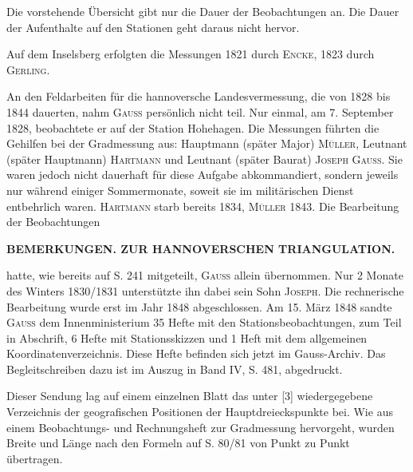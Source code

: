 \par\noindent\hspace*{\parindent}Die vorstehende Übersicht gibt nur die Dauer der Beobachtungen an. Die Dauer der Aufenthalte auf den Stationen geht daraus nicht hervor.

\par\noindent\hspace*{\parindent}Auf dem Inselsberg erfolgten die Messungen 1821 durch \textsc{Encke}, 1823 durch \textsc{Gerling}.

\par\noindent\hspace*{\parindent}An den Feldarbeiten für die hannoversche Landesvermessung, die von 1828 bis 1844 dauerten, nahm \textsc{Gauss} persönlich nicht teil. Nur einmal, am 7. September 1828, beobachtete er auf der Station Hohehagen. Die Messungen führten die Gehilfen bei der Gradmessung aus: Hauptmann (später Major) \textsc{Müller}, Leutnant (später Hauptmann) \textsc{Hartmann} und Leutnant (später Baurat) \textsc{Joseph Gauss}. Sie waren jedoch nicht dauerhaft für diese Aufgabe abkommandiert, sondern jeweils nur während einiger Sommermonate, soweit sie im militärischen Dienst entbehrlich waren. \textsc{Hartmann} starb bereits 1834, \textsc{Müller} 1843. Die Bearbeitung der Beobachtungen
\par\medskip\noindent{}\par

\clearpage
\noindent{}\hfill\textbf{BEMERKUNGEN. ZUR HANNOVERSCHEN TRIANGULATION.}\hfill\null\par\medskip
\noindent hatte, wie bereits auf S. 241 mitgeteilt, \textsc{Gauss} allein übernommen. Nur 2 Monate des Winters 1830/1831 unterstützte ihn dabei sein Sohn \textsc{Joseph}. Die rechnerische Bearbeitung wurde erst im Jahr 1848 abgeschlossen. Am 15. März 1848 sandte \textsc{Gauss} dem Innenministerium 35 Hefte mit den Stationsbeobachtungen, zum Teil in Abschrift, 6 Hefte mit Stationsskizzen und 1 Heft mit dem allgemeinen Koordinatenverzeichnis. Diese Hefte befinden sich jetzt im Gauss-Archiv. Das Begleitschreiben dazu ist im Auszug in Band IV, S. 481, abgedruckt.

\par\noindent\hspace*{\parindent}Dieser Sendung lag auf einem einzelnen Blatt das unter [3] wiedergegebene Verzeichnis der geografischen Positionen der Hauptdreieckspunkte bei. Wie aus einem Beobachtungs- und Rechnungsheft zur Gradmessung hervorgeht, wurden Breite und Länge nach den Formeln auf S. 80/81 von Punkt zu Punkt übertragen.


